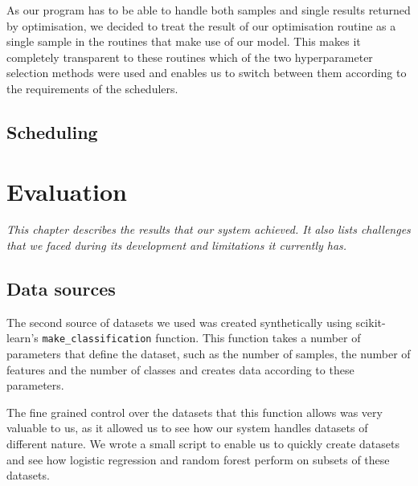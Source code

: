\documentclass[a4paper,12pt,twoside,openright]{report}
\begin{document}
As our program has to be able to handle both samples and single results returned by optimisation, we decided to treat the result of our optimisation routine as a single sample in the routines that make use of our model. This makes it completely transparent to these routines which of the two hyperparameter selection methods were used and enables us to switch between them according to the requirements of the schedulers.

\section{Scheduling} 


\chapter{Evaluation}
\textit{This chapter describes the results that our system achieved. It also lists challenges that we faced during its development and limitations it currently has.}



 

\section{Data sources}
The second source of datasets we used was created synthetically using scikit-learn's \texttt{make\_classification} function. This function takes a number of parameters that define the dataset, such as the number of samples, the number of features and the number of classes and creates data according to these parameters. 

The fine grained control over the datasets that this function allows was very valuable to us, as it allowed us to see how our system handles datasets of different nature. We wrote a small script to enable us to quickly create datasets and see how logistic regression and random forest perform on subsets of these datasets.
\end{document}
